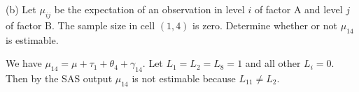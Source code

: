 \bigskip
\noindent
(b) Let $\mu_{ij}$ be the expectation of an observation in level $i$
of factor A and level $j$ of factor B. The sample size in cell
$(1,4)$ is zero. Determine whether or not $\mu_{14}$ is estimable.

\bigskip
\noindent
We have $\mu_{14}=\mu+\tau_1+\theta_4+\gamma_{14}$.
Let $L_1=L_2=L_8=1$ and all other $L_i=0$.
Then by the SAS output $\mu_{14}$ is not estimable because
$L_{11}\ne L_2$.
